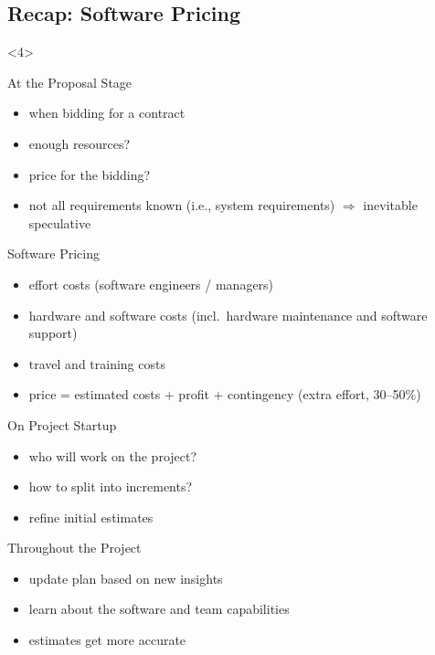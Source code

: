 \subsection{Recap: Software Pricing}
\begin{frame}<4>{\insertsubsection\ \mytitlesource{\sommerville}}
	\begin{fancycolumns}
		\begin{note}{At the Proposal Stage}
			\begin{itemize}
				\item when bidding for a contract
				\item enough resources?
				\item price for the bidding?
				\item not all requirements known (i.e., system requirements) $\Rightarrow$ inevitable speculative
			\end{itemize}
		\end{note}
		\pause
		\begin{example}{Software Pricing}
			\begin{itemize}
				\item effort costs (software engineers / managers)
				\item hardware and software costs (incl.\ hardware maintenance and software support)
				\item travel and training costs
				\item price = estimated costs + profit + contingency (extra effort, 30--50\%)
			\end{itemize}
		\end{example}
		\nextcolumn
		\pause
		\begin{note}{On Project Startup}
			\begin{itemize}
				\item who will work on the project?
				\item how to split into increments?
				\item refine initial estimates
			\end{itemize}
		\end{note}
		\pause
		\begin{note}{Throughout the Project}
			\begin{itemize}
				\item update plan based on new insights
				\item learn about the software and team capabilities
				\item estimates get more accurate
			\end{itemize}
		\end{note}
	\end{fancycolumns}
\end{frame}

